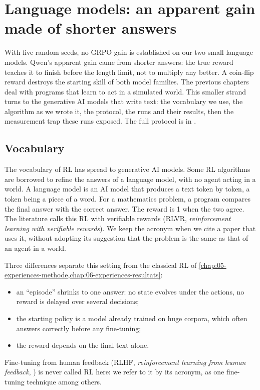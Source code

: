 \chapter{Language models: an apparent gain made of shorter answers}
\label{chap:07-modeles-de-langue}

With five random seeds, no GRPO gain is established on our two small language models. Qwen's apparent gain
came from shorter answers: the true reward teaches it to finish before the length limit, not to multiply any
better. A coin-flip reward destroys the starting skill of both model families. The previous chapters deal
with programs that learn to act in a simulated world. This smaller strand turns to the generative AI models
that write text: the vocabulary we use, the algorithm as we wrote it, the protocol, the runs and their
results, then the measurement trap these runs exposed. The full protocol is in
.

\section{Vocabulary}
\label{sec:llm-vocabulaire}

The vocabulary of RL has spread to generative AI models. Some RL algorithms are borrowed to refine
the answers of a language model, with no agent acting in a world. A language model is an AI model
that produces a text token by token, a token being a piece of a word. For a mathematics problem, a
program compares the final answer with the correct answer. The reward is 1 when the two agree.
The literature calls this RL with verifiable rewards (RLVR, \emph{reinforcement learning with
verifiable rewards}). We keep the acronym when we cite a paper that uses it, without adopting its
suggestion that the problem is the same as that of an agent in a world.

Three differences separate this setting from the classical RL of
\cref{chap:05-experiences-methode,chap:06-experiences-resultats}:
\begin{itemize}
  \item an \enquote{episode} shrinks to one answer: no state evolves under the actions, no
        reward is delayed over several decisions;
  \item the starting policy is a model already trained on huge corpora, which often answers
        correctly before any fine-tuning;
  \item the reward depends on the final text alone.
\end{itemize}
Fine-tuning from human feedback (RLHF, \emph{reinforcement learning from human feedback},
\cite{ouyang2022instructgpt}) is never called RL here: we refer to it by its acronym, as one
fine-tuning technique among others.

